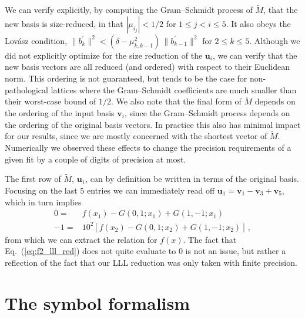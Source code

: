\documentclass[a4paper,11pt]{article}
\begin{document}
We can verify explicitly, by computing the Gram–Schmidt process of $\tilde{M}$, that the new basis is size-reduced, in that $|\mu_{i_j}|<1/2$ for $ 1\leq j < i \leq 5$. It also obeys the Lov\'asz  condition, $\| b_k^\prime\|^2 < (\delta - \mu_{k,k-1}^2)\,\| b_{k-1}^\prime\|^2$ for $2\leq k\leq 5$. Although we did not explicitly optimize for the size reduction of the $\mathbf{u}_i$, we can verify that the new basis vectors are all reduced (and ordered) with respect to their Euclidean norm. This ordering is not guaranteed, but tends to be the case for non-pathological lattices where the Gram–Schmidt coefficients are much smaller than their worst-case bound of $1/2$. We also note that the final form of $\tilde{M}$ depends on the ordering of the input basis $\mathbf{v}_i$, since the Gram–Schmidt process depends on the ordering of the original basis vectors. In practice this also has minimal impact for our results, since we are mostly concerned with the shortest vector of $\tilde{M}$. Numerically we observed these effects to change the precision requirements of a given fit by a couple of digits of precision at most.

The first row of $\tilde{M}$, $\mathbf{u}_1$, can by definition be written in terms of the original basis. Focusing on the last 5 entries we can immediately read off $\mathbf{u}_1 = \mathbf{v}_1 - \mathbf{v}_3 + \mathbf{v}_5$, which in turn implies 
\begin{align}
    0 =&  f(x_1) - G(0,1;x_1) + G(1,-1;x_1) \\
    -1 =&  10^2 \left[f(x_2) - G(0,1;x_2) + G(1,-1;x_2) \right] \label{eq:f2_lll_red} \,, 
\end{align}
from which we can extract the relation for $f(x)$. The fact that Eq.~(\ref{eq:f2_lll_red}) does not quite evaluate to 0 is not an issue, but rather a reflection of the fact that our LLL reduction was only taken with finite precision.


\section{The symbol formalism}\label{sec:symbols}
\end{document}
